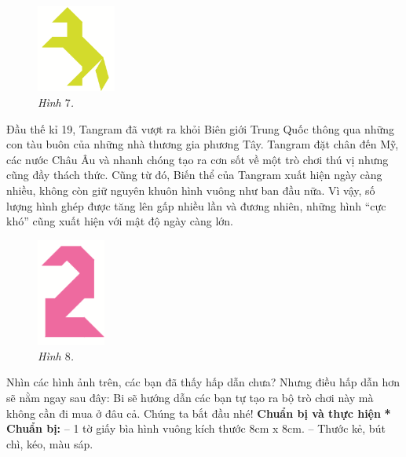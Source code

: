 	\begin{multicols}{2}
		\begin{figure}[H]
			\vspace*{5pt}	
			\captionsetup{labelformat=empty}
			\centering
			\captionsetup{justification=raggedleft}
			\includegraphics[width =0.23\textwidth]{image7}
			\caption{\small\it Hình $7$.}
			\vspace*{-10pt}
		\end{figure}
		Đầu thế kỉ 19, Tangram đã vượt ra khỏi Biên giới Trung Quốc thông qua những con tàu buôn của những nhà thương gia phương Tây. Tangram đặt chân đến Mỹ, các nước Châu Âu và nhanh chóng tạo ra cơn sốt về một trò chơi thú vị nhưng cũng đầy thách thức. Cũng từ đó, Biến thể của
		Tangram xuất hiện ngày càng nhiều, không còn giữ nguyên khuôn hình vuông như ban đầu nữa. Vì vậy, số lượng hình ghép được tăng lên gấp nhiều lần và đương nhiên, những hình “cực khó” cũng xuất hiện với mật độ ngày càng lớn.
		\begin{figure}[H]
			\vspace*{-10pt}	
			\captionsetup{labelformat=empty}
			\centering
			\captionsetup{justification=raggedleft}
			\includegraphics[width =0.2\textwidth]{image8}
			\caption{\small\it Hình $8$.}
			\vspace*{-10pt}
		\end{figure}
		Nhìn các hình ảnh trên, các bạn đã thấy hấp dẫn chưa? Nhưng điều hấp dẫn hơn sẽ nằm ngay sau đây: Bi sẽ hướng dẫn các bạn tự tạo ra bộ trò chơi này mà không cần đi mua ở đâu cả. Chúng ta bắt đầu nhé!
	\vskip 0.1cm
	\textbf{Chuẩn bị và thực hiện}
	\vskip 0.1cm
	\textbf{* Chuẩn bị:}
	\vskip 0.1cm
	-- 1 tờ giấy bìa hình vuông kích thước 8cm x 8cm.
	\vskip 0.1cm
	-- Thước kẻ, bút chì, kéo, màu sáp.
	\vskip 0.1cm

\end{multicols}

